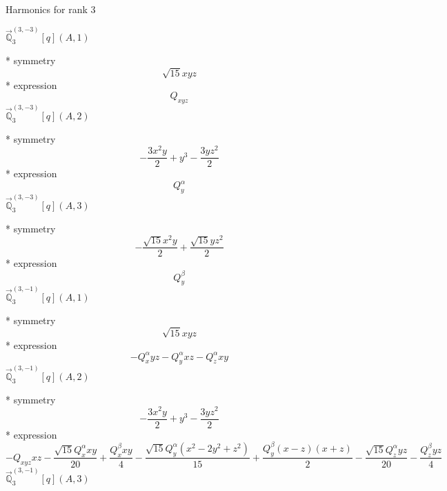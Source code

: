 \documentclass[fleqn,8pt]{jsarticle}
\begin{document}
\noindent * Harmonics for rank 3

\noindent\quad $\vec{\mathbb{Q}}_{3}^{(3,-3)}[q](A,1)$

\noindent\quad ** symmetry
\begin{dmath*}
\sqrt{15} x y z
\end{dmath*}
\noindent\quad ** expression
\begin{dmath*}
Q_{xyz}
\end{dmath*}
\noindent\quad $\vec{\mathbb{Q}}_{3}^{(3,-3)}[q](A,2)$

\noindent\quad ** symmetry
\begin{dmath*}
- \frac{3 x^{2} y}{2} + y^{3} - \frac{3 y z^{2}}{2}
\end{dmath*}
\noindent\quad ** expression
\begin{dmath*}
Q_{y}^{\alpha}
\end{dmath*}
\noindent\quad $\vec{\mathbb{Q}}_{3}^{(3,-3)}[q](A,3)$

\noindent\quad ** symmetry
\begin{dmath*}
- \frac{\sqrt{15} x^{2} y}{2} + \frac{\sqrt{15} y z^{2}}{2}
\end{dmath*}
\noindent\quad ** expression
\begin{dmath*}
Q_{y}^{\beta}
\end{dmath*}
\noindent\quad $\vec{\mathbb{Q}}_{3}^{(3,-1)}[q](A,1)$

\noindent\quad ** symmetry
\begin{dmath*}
\sqrt{15} x y z
\end{dmath*}
\noindent\quad ** expression
\begin{dmath*}
- Q_{x}^{\alpha} y z - Q_{y}^{\alpha} x z - Q_{z}^{\alpha} x y
\end{dmath*}
\noindent\quad $\vec{\mathbb{Q}}_{3}^{(3,-1)}[q](A,2)$

\noindent\quad ** symmetry
\begin{dmath*}
- \frac{3 x^{2} y}{2} + y^{3} - \frac{3 y z^{2}}{2}
\end{dmath*}
\noindent\quad ** expression
\begin{dmath*}
- Q_{xyz} x z - \frac{\sqrt{15} Q_{x}^{\alpha} x y}{20} + \frac{Q_{x}^{\beta} x y}{4} - \frac{\sqrt{15} Q_{y}^{\alpha} \left(x^{2} - 2 y^{2} + z^{2}\right)}{15} + \frac{Q_{y}^{\beta} \left(x - z\right) \left(x + z\right)}{2} - \frac{\sqrt{15} Q_{z}^{\alpha} y z}{20} - \frac{Q_{z}^{\beta} y z}{4}
\end{dmath*}
\noindent\quad $\vec{\mathbb{Q}}_{3}^{(3,-1)}[q](A,3)$
\end{document}
